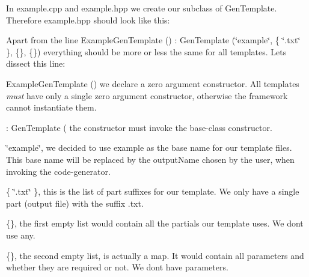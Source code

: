 In {\ttfamily example.\+cpp} and {\ttfamily example.\+hpp} we create our subclass of {\ttfamily Gen\+Template}. Therefore {\ttfamily example.\+hpp} should look like this\+:


\begin{DoxyCode}{0}
\DoxyCodeLine{\textcolor{preprocessor}{\#ifndef ELEKTRA\_EXAMPLE\_HPP}}
\DoxyCodeLine{\textcolor{preprocessor}{\#define ELEKTRA\_EXAMPLE\_HPP}}
\DoxyCodeLine{}
\DoxyCodeLine{\textcolor{preprocessor}{\#include <gen/template.hpp>}}
\DoxyCodeLine{}
\DoxyCodeLine{\{}
\DoxyCodeLine{\textcolor{keyword}{public}:}
\DoxyCodeLine{    \{}
\DoxyCodeLine{    \}}
\DoxyCodeLine{}
\DoxyCodeLine{\textcolor{keyword}{protected}:}
\DoxyCodeLine{\};}
\DoxyCodeLine{}
\DoxyCodeLine{\textcolor{preprocessor}{\#endif // ELEKTRA\_EXAMPLE\_HPP}}
\end{DoxyCode}


Apart from the line {\ttfamily Example\+Gen\+Template () \+: Gen\+Template (\char`\"{}example\char`\"{}, \{ \char`\"{}.\+txt\char`\"{} \}, \{\}, \{\})} everything should be more or less the same for all templates. Let\textquotesingle{}s dissect this line\+:


\begin{DoxyItemize}
\item {\ttfamily Example\+Gen\+Template ()} we declare a zero argument constructor. All templates {\itshape must} have only a single zero argument constructor, otherwise the framework cannot instantiate them.
\item {\ttfamily \+: Gen\+Template (} the constructor must invoke the base-\/class constructor.
\item {\ttfamily \char`\"{}example\char`\"{},} we decided to use {\ttfamily example} as the base name for our template files. This base name will be replaced by the {\ttfamily output\+Name} chosen by the user, when invoking the code-\/generator.
\item {\ttfamily \{ \char`\"{}.\+txt\char`\"{} \},} this is the list of part suffixes for our template. We only have a single part (output file) with the suffix {\ttfamily .txt}.
\item {\ttfamily \{\},} the first empty list would contain all the partials our template uses. We don\textquotesingle{}t use any.
\item {\ttfamily \{\},} the second empty list, is actually a map. It would contain all parameters and whether they are required or not. We don\textquotesingle{}t have parameters.
\end{DoxyItemize}

